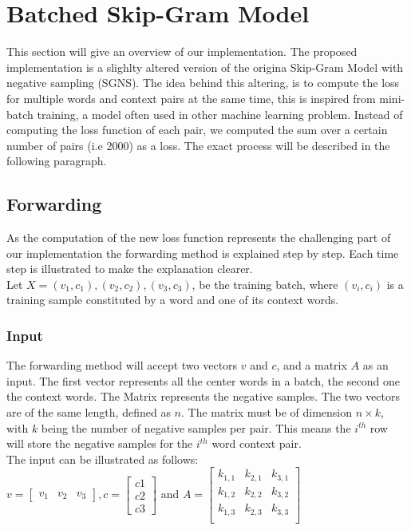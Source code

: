 \section{Batched Skip-Gram Model} \label{sec:contribution}
This section will give an overview of our implementation. The proposed implementation is a slighlty altered version of the origina Skip-Gram Model with negative sampling (SGNS). The idea behind this altering, is to compute the loss for multiple words and context pairs at the same time, this is inspired from mini-batch training, a model often used in other machine learning problem. Instead of computing the loss function of each pair, we computed the sum over a certain number of pairs (i.e 2000) as a loss. The exact process will be described in the following paragraph.
\subsection{Forwarding}
As the computation of the new loss function represents the challenging part of our implementation the forwarding method is explained step by step. Each time step is illustrated to make the explanation clearer.\\
Let $X = {(v_1,c_1),(v_2,c_2),(v_3,c_3)}$, be the training batch, where $(v_i,c_i)$ is a training sample constituted by a word and one of its context words. 
\subsubsection{Input}
The forwarding method will accept two vectors $v$ and $c$, and a matrix $A$ as an input. The first vector represents all the center words in a batch, the second one the context words. The Matrix represents the negative samples. The two vectors are of the same length, defined as $n$. The matrix must be of dimension $n \times k$, with $k$ being the number of negative samples per pair. This means the $i^{th}$ row will store the negative samples for the $i^{th}$ word context pair.\\
The input can be illustrated as follows: \\
$v = \begin{bmatrix}
v_1 & v_2 & v_3
\end{bmatrix}, c = \begin{bmatrix}
c1\\
c2\\
c3\end{bmatrix}$ and $A =
\begin{bmatrix}
k_{1,1} & k_{2,1} & k_{3,1}\\
k_{1,2} & k_{2,2} & k_{3,2}\\
k_{1,3} & k_{2,3} & k_{3,3}\\
\end{bmatrix}$\\

